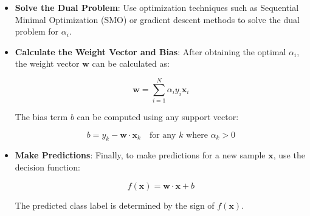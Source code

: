 \begin{itemize}
    \item \textbf{Solve the Dual Problem}:
    Use optimization techniques such as Sequential Minimal Optimization (SMO) or gradient descent methods to solve the dual problem for \(\alpha_i\).

    \item \textbf{Calculate the Weight Vector and Bias}:
    After obtaining the optimal \(\alpha_i\), the weight vector \(\mathbf{w}\) can be calculated as:
    
    \[
    \mathbf{w} = \sum_{i=1}^{N} \alpha_i y_i \mathbf{x}_i
    \]

    The bias term \(b\) can be computed using any support vector:
    
    \[
    b = y_k - \mathbf{w} \cdot \mathbf{x}_k \quad \text{for any } k \text{ where } \alpha_k > 0
    \]

    \item \textbf{Make Predictions}:
    Finally, to make predictions for a new sample \(\mathbf{x}\), use the decision function:
    
    \[
    f(\mathbf{x}) = \mathbf{w} \cdot \mathbf{x} + b
    \]
    
    The predicted class label is determined by the sign of \(f(\mathbf{x})\).
\end{itemize}
